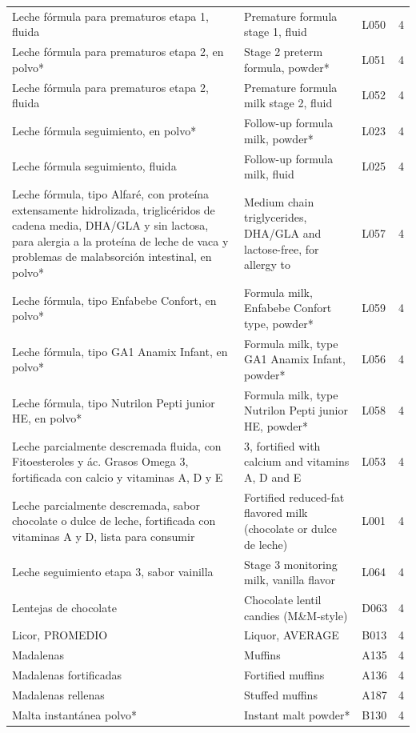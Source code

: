 {\begin{longtable}{p{4.3cm}p{5.5cm}p{1.5cm}p{0.7cm}}
Leche fórmula para prematuros etapa 1, fluida & Premature formula stage 1, fluid & L050 & 4\\
Leche fórmula para prematuros etapa 2, en polvo* & Stage 2 preterm formula, powder* & L051 & 4\\
Leche fórmula para prematuros etapa 2, fluida & Premature formula milk stage 2, fluid & L052 & 4\\
Leche fórmula seguimiento, en polvo* & Follow-up formula milk, powder* & L023 & 4\\
Leche fórmula seguimiento, fluida & Follow-up formula milk, fluid & L025 & 4\\
Leche fórmula, tipo Alfaré, con proteína extensamente hidrolizada, triglicéridos de cadena media, DHA/GLA y sin lactosa, para alergia a la proteína de leche de vaca y problemas de malabsorción intestinal, en polvo* & Medium chain triglycerides, DHA/GLA and lactose-free, for allergy to & L057 & 4\\
Leche fórmula, tipo Enfabebe Confort, en polvo* & Formula milk, Enfabebe Confort type, powder* & L059 & 4\\
Leche fórmula, tipo GA1 Anamix Infant, en polvo* & Formula milk, type GA1 Anamix Infant, powder* & L056 & 4\\
Leche fórmula, tipo Nutrilon Pepti junior HE, en polvo* & Formula milk, type Nutrilon Pepti junior HE, powder* & L058 & 4\\
Leche parcialmente descremada fluida, con Fitoesteroles y ác. Grasos Omega 3, fortificada con calcio y vitaminas A, D y E & 3, fortified with calcium and vitamins A, D and E & L053 & 4\\
Leche parcialmente descremada, sabor chocolate o dulce de leche, fortificada con vitaminas A y D, lista para consumir & Fortified reduced-fat flavored milk (chocolate or dulce de leche) & L001 & 4\\
Leche seguimiento etapa 3, sabor vainilla & Stage 3 monitoring milk, vanilla flavor & L064 & 4\\
Lentejas de chocolate & Chocolate lentil candies (M\&M-style) & D063 & 4\\
Licor, PROMEDIO & Liquor, AVERAGE & B013 & 4\\
Madalenas & Muffins & A135 & 4\\
Madalenas fortificadas & Fortified muffins & A136 & 4\\
Madalenas rellenas & Stuffed muffins & A187 & 4\\
Malta instantánea polvo* & Instant malt powder* & B130 & 4\\

\end{longtable}}
